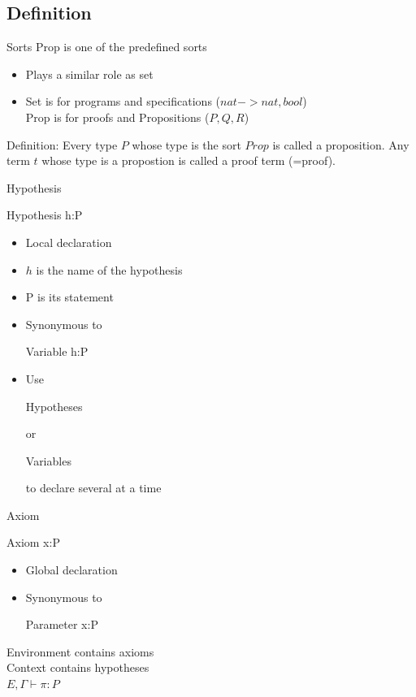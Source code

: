 \subsection{Definition}
\begin{frame}{Sorts} %
	Prop is one of the predefined sorts
	\begin{itemize}
		\item Plays a similar role as set 
		\pause
		\item Set is for programs and specifications ($nat -> nat, bool$)\\
		Prop is for proofs and Propositions ($P, Q, R$)
	\end{itemize}
	\pause
	Definition: Every type $P$ whose type is the sort $Prop$ is called a proposition. Any term $t$ whose type is a propostion is called a proof term (=proof).
\end{frame}
\begin{frame}[fragile]{Hypothesis}
	\begin{user}
	Hypothesis h:P
	\end{user}
	\begin{itemize}
		\item Local declaration
		\pause
		\item $h$ is the name of the hypothesis
		\pause
		\item P is its statement
		\pause
		\item Synonymous to
		\begin{user}
		Variable h:P
		\end{user}
		\pause
		\item Use
		\begin{user}
		Hypotheses
		\end{user}
		or
		\begin{user}
		Variables
		\end{user}
		to declare several at a time
	\end{itemize}
\end{frame}
\begin{frame}[fragile]{Axiom}
	\begin{user}
	Axiom x:P
	\end{user}
	\begin{itemize}
		\item Global declaration
		\pause
		\item Synonymous to
		\begin{user}
		Parameter x:P
		\end{user}
	\end{itemize}
	\pause
	\medskip
	Environment contains axioms\\
	\pause
	\medskip
	Context contains hypotheses\\
	\pause
	\medskip
	$E, \Gamma \vdash \pi : P$
\end{frame}


